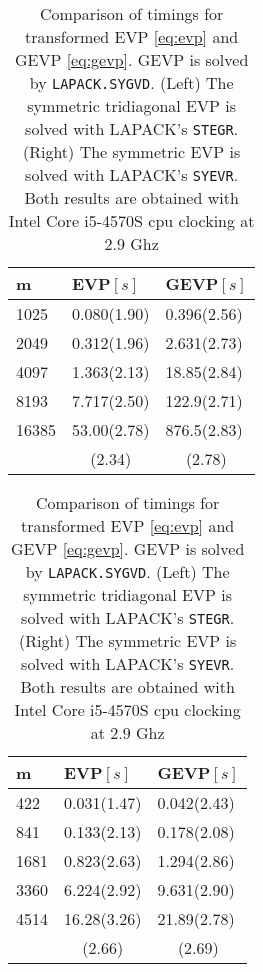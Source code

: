 \documentclass[10pt, a4paper]{article}
\begin{document}
\begin{table}
\caption{Comparison of timings for transformed EVP \eqref{eq:evp} and 
  GEVP \eqref{eq:gevp}. GEVP is solved by \texttt{LAPACK.SYGVD}. (Left) The
  symmetric tridiagonal EVP is solved with LAPACK's \texttt{STEGR}. (Right)
  The symmetric EVP is solved with LAPACK's \texttt{SYEVR}. Both results 
  are obtained with Intel Core i5-4570S cpu clocking at 2.9 Ghz}
\label{tab:evp}
\begin{subtable}{0.48\textwidth}
  \centering
  \footnotesize{
  \begin{tabular}{l|ll}
  \hline
    m & EVP$\left[s\right]$ & GEVP$\left[s\right]$\\
  \hline
  1025  & 0.080(1.90) & 0.396(2.56)\\
  2049  & 0.312(1.96) & 2.631(2.73)\\
  4097  & 1.363(2.13) & 18.85(2.84)\\
  8193  & 7.717(2.50) & 122.9(2.71)\\
  16385 & 53.00(2.78) & 876.5(2.83)\\
  \hline
      & \multicolumn{1}{c}{(2.34)} & \multicolumn{1}{c}{(2.78)}\\
  \hline
  \end{tabular}
  }
\end{subtable}
%
\begin{subtable}{0.48\textwidth}
  \centering
  \footnotesize{
  \begin{tabular}{l|ll}
  \hline
    m & EVP$\left[s\right]$ & GEVP$\left[s\right]$\\
  \hline
  422  & 0.031(1.47) & 0.042(2.43)\\
  841  & 0.133(2.13) & 0.178(2.08)\\
  1681 & 0.823(2.63) & 1.294(2.86)\\
  3360 & 6.224(2.92) & 9.631(2.90)\\
  4514 & 16.28(3.26) & 21.89(2.78)\\
  \hline
    & \multicolumn{1}{c}{(2.66)} & \multicolumn{1}{c}{(2.69)}\\
  \hline
  \end{tabular}
  }
\end{subtable}
\end{table}
\end{document}
